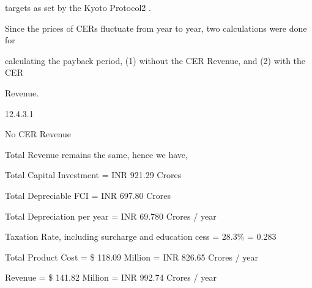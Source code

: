 \documentclass[a4paper,portrait,12pt]{article}
\begin{document}
\begin{flushleft}
targets as set by the Kyoto Protocol2 .
\end{flushleft}


\begin{flushleft}
Since the prices of CERs fluctuate from year to year, two calculations were done for
\end{flushleft}


\begin{flushleft}
calculating the payback period, (1) without the CER Revenue, and (2) with the CER
\end{flushleft}


\begin{flushleft}
Revenue.
\end{flushleft}





12.4.3.1





\begin{flushleft}
No CER Revenue
\end{flushleft}





\begin{flushleft}
Total Revenue remains the same, hence we have,
\end{flushleft}


\begin{flushleft}
Total Capital Investment = INR 921.29 Crores
\end{flushleft}


\begin{flushleft}
Total Depreciable FCI = INR 697.80 Crores
\end{flushleft}


\begin{flushleft}
Total Depreciation per year = INR 69.780 Crores / year
\end{flushleft}


\begin{flushleft}
Taxation Rate, including surcharge and education cess = 28.3\% = 0.283
\end{flushleft}


\begin{flushleft}
Total Product Cost = \$ 118.09 Million = INR 826.65 Crores / year
\end{flushleft}


\begin{flushleft}
Revenue = \$ 141.82 Million = INR 992.74 Crores / year
\end{flushleft}
\end{document}
